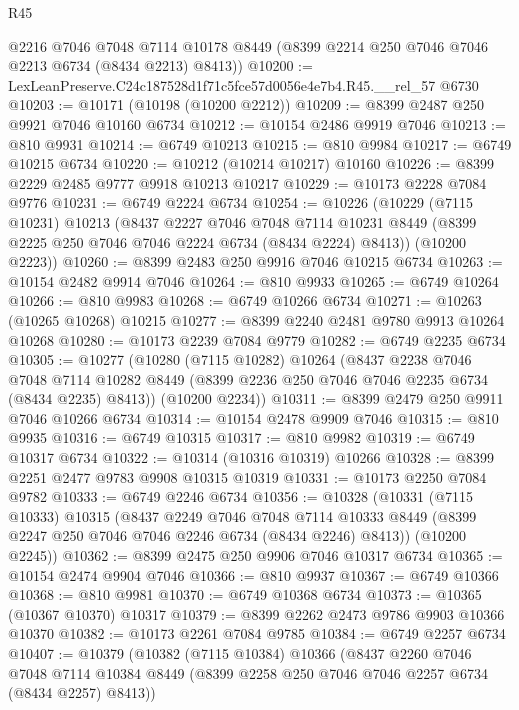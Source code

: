 \begin{lexlean}{R45}
\begin{coremodule}
{      @2216
      @7046
      @7048
      @7114
      @10178
      @8449
      (@8399 @2214 @250 @7046 @7046 @2213 @6734 (@8434 @2213) @8413))
@10200 := LexLeanPreserve.C24c187528d1f71c5fce57d0056e4e7b4.R45.__rel_57 @6730
@10203 := @10171 (@10198 (@10200 @2212))
@10209 := @8399 @2487 @250 @9921 @7046 @10160 @6734
@10212 := @10154 @2486 @9919 @7046
@10213 := @810 @9931
@10214 := @6749 @10213
@10215 := @810 @9984
@10217 := @6749 @10215 @6734
@10220 := @10212 (@10214 @10217) @10160
@10226 := @8399 @2229 @2485 @9777 @9918 @10213 @10217
@10229 := @10173 @2228 @7084 @9776
@10231 := @6749 @2224 @6734
@10254 := @10226
    (@10229
      (@7115 @10231)
      @10213
      (@8437
        @2227
        @7046
        @7048
        @7114
        @10231
        @8449
        (@8399 @2225 @250 @7046 @7046 @2224 @6734 (@8434 @2224) @8413))
      (@10200 @2223))
@10260 := @8399 @2483 @250 @9916 @7046 @10215 @6734
@10263 := @10154 @2482 @9914 @7046
@10264 := @810 @9933
@10265 := @6749 @10264
@10266 := @810 @9983
@10268 := @6749 @10266 @6734
@10271 := @10263 (@10265 @10268) @10215
@10277 := @8399 @2240 @2481 @9780 @9913 @10264 @10268
@10280 := @10173 @2239 @7084 @9779
@10282 := @6749 @2235 @6734
@10305 := @10277
    (@10280
      (@7115 @10282)
      @10264
      (@8437
        @2238
        @7046
        @7048
        @7114
        @10282
        @8449
        (@8399 @2236 @250 @7046 @7046 @2235 @6734 (@8434 @2235) @8413))
      (@10200 @2234))
@10311 := @8399 @2479 @250 @9911 @7046 @10266 @6734
@10314 := @10154 @2478 @9909 @7046
@10315 := @810 @9935
@10316 := @6749 @10315
@10317 := @810 @9982
@10319 := @6749 @10317 @6734
@10322 := @10314 (@10316 @10319) @10266
@10328 := @8399 @2251 @2477 @9783 @9908 @10315 @10319
@10331 := @10173 @2250 @7084 @9782
@10333 := @6749 @2246 @6734
@10356 := @10328
    (@10331
      (@7115 @10333)
      @10315
      (@8437
        @2249
        @7046
        @7048
        @7114
        @10333
        @8449
        (@8399 @2247 @250 @7046 @7046 @2246 @6734 (@8434 @2246) @8413))
      (@10200 @2245))
@10362 := @8399 @2475 @250 @9906 @7046 @10317 @6734
@10365 := @10154 @2474 @9904 @7046
@10366 := @810 @9937
@10367 := @6749 @10366
@10368 := @810 @9981
@10370 := @6749 @10368 @6734
@10373 := @10365 (@10367 @10370) @10317
@10379 := @8399 @2262 @2473 @9786 @9903 @10366 @10370
@10382 := @10173 @2261 @7084 @9785
@10384 := @6749 @2257 @6734
@10407 := @10379
    (@10382
      (@7115 @10384)
      @10366
      (@8437
        @2260
        @7046
        @7048
        @7114
        @10384
        @8449
        (@8399 @2258 @250 @7046 @7046 @2257 @6734 (@8434 @2257) @8413))
}
\end{coremodule}
\end{lexlean}
